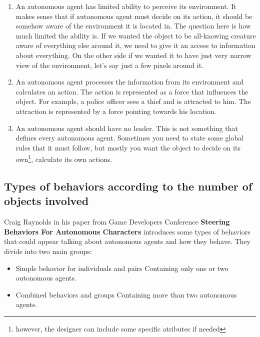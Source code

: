 \documentclass[10pt,twoside,english,a4paper]{article}
\begin{document}
\begin{enumerate}
\item An autonomous agent has limited ability to perceive its environment. It makes sense that if autonomous agent must decide on its action, it should be somehow aware of the environment it is located in. The question here is how much limited the ability is. If we wanted the object to be all-knowing creature aware of everything else around it, we need to give it an access to information about everything. On the other side if we wanted it to have just very narrow view of the environment, let’s say just a few pixels around it.

\item An autonomous agent processes the information from its environment and calculates an action. The action is represented as a force that influences the object. For example, a police officer sees a thief and is attracted to him. The attraction is represented by a force pointing towards his location. 

\item An autonomous agent should have no leader. This is not something that defines every autonomous agent. Sometimes you need to state some global rules that it must follow, but mostly you want the object to decide on its own\footnote{however, the designer can include some specific atributes if needed}, calculate its own actions.

\end{enumerate}

\subsection{Types of behaviors according to the number of objects involved} \label{types of behaviors}

Craig Raynolds in his paper from Game Developers Conference \textbf{Steering Behaviors For Autonomous Characters} \cite{Raynolds} introduces some types of behaviors that could appear talking about autonomous agents and how they behave. They divide into two main groups:

\begin{itemize}
\item Simple behavior for individuals and pairs\newline
Containing only one or two autonomous agents.

\item Combined behaviors and groups\newline
Containing more than two autonomous agents.

\end{itemize}
\end{document}
